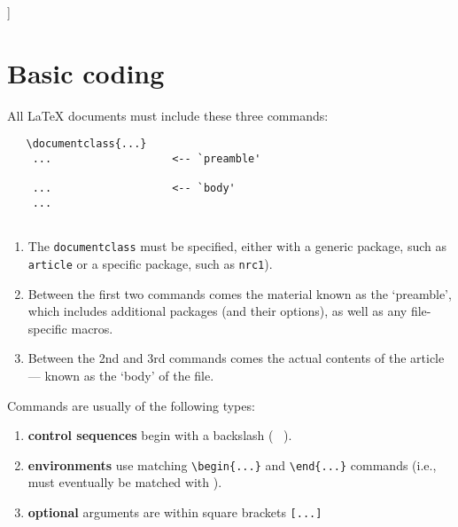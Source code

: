 \vspace{1pc}

]



\section{Basic coding}

All \LaTeX{} documents must include these three commands:

\begin{verbatim}
   \documentclass{...}
    ...                   <-- `preamble'
   
    ...                   <-- `body'
    ...
   
\end{verbatim}

\begin{enumerate} \itemsep=0pt
   \item The \verb|documentclass| must be specified, either with a
         generic package, such as \verb|article| or a specific
         package, such as \verb|nrc1|).

   \item Between the first two commands comes the material known as
         the `preamble', which includes additional packages (and their
         options), as well as any file-specific macros.

   \item Between the 2nd and 3rd commands comes the actual contents of
         the article --- known as the `body' of the file.
\end{enumerate}

\noindent Commands are usually of the following types:

\begin{enumerate} \itemsep=0pt
   \item {\bf control sequences} begin with a backslash ( \blash\ ). 

   \item {\bf environments} use matching \verb|\begin{...}| and\break
         \verb|\end{...}| commands (i.e., \verb|| must
         eventually be matched with \verb||).

   \item {\bf optional} arguments are within square brackets \verb|[...]|
\end{enumerate}


